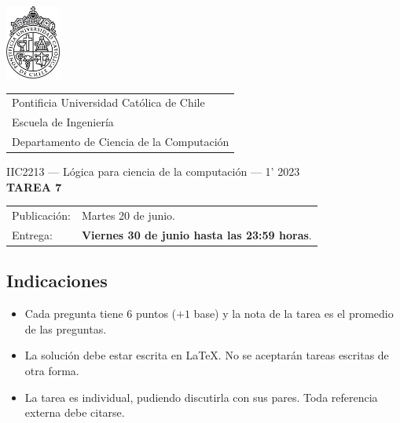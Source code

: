 \documentclass{article}
\begin{document}
\includegraphics[width=1.8cm]{uc.png}
\vspace*{-1.9cm}

\hspace*{2.1cm}
 \begin{tabular}{l}
  \sc Pontificia Universidad Católica de Chile \\
  \sc Escuela de Ingeniería \\
  \sc Departamento de Ciencia de la Computación
 \end{tabular}
 \bigskip

\vspace*{5mm}
\begin{center}
{IIC2213 --- Lógica para ciencia de la computación --- 1' 2023} \\
\vspace{3mm}
{\Large\bf TAREA 7} \\
\vspace{2mm}
\end{center}

\begin{tabular}{ll}
Publicación: & Martes 20 de junio. \\
Entrega: & \textbf{Viernes 30 de junio hasta las 23:59 horas}. \\
\end{tabular}

\subsection*{Indicaciones}

\begin{itemize}
\item Cada pregunta tiene 6 puntos ($+1$ base) y la nota de la tarea es el promedio de  las preguntas.
\item La solución debe estar escrita en \LaTeX. No se aceptarán tareas escritas de otra forma.
\item La tarea es individual, pudiendo discutirla con sus pares. Toda referencia externa debe citarse.
\end{itemize}
\end{document}
